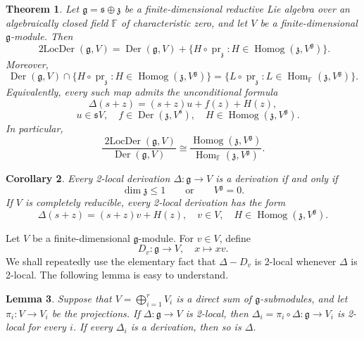 \documentclass[12pt,reqno]{amsart}
\newtheorem{theorem}{Theorem}[section]
\newtheorem{lemma}[theorem]{Lemma}
\newtheorem{corollary}[theorem]{Corollary}
\theoremstyle{definition}
\theoremstyle{remark}
\numberwithin{equation}{section}
\newcommand{\F}{\mathbb{F}}
\newcommand{\g}{\mathfrak{g}}
\newcommand{\s}{\mathfrak{s}}
\newcommand{\z}{\mathfrak{z}}
\newcommand{\Der}{\operatorname{Der}}
\newcommand{\Homog}{\operatorname{Homog}}
\newcommand{\prz}{\operatorname{pr}_{\z}}
\begin{document}
\begin{theorem}\label{thm:reductive}
Let \(\g=\s\oplus\z\) be a finite-dimensional reductive Lie algebra over an
algebraically closed field \(\F\) of characteristic zero, and let \(V\) be a
finite-dimensional \(\g\)-module.  Then
\begin{equation}\label{eq:classification-intro}
 \operatorname{2LocDer}(\g,V)
 =
 \Der(\g,V)
 +
 \{H\circ\prz:H\in\Homog(\z,V^\g)\}.
\end{equation}
Moreover,
\begin{equation}\label{eq:intersection-intro}
 \Der(\g,V)\cap\{H\circ\prz:H\in\Homog(\z,V^\g)\}
=\{L\circ\prz:L\in\operatorname{Hom}_{\F}(\z,V^\g)\}.
\end{equation}
Equivalently, every such map admits the
unconditional formula
\[
 \Delta(s+z)= (s+z)u+f(z)+H(z),
\]
\[
\quad u\in \s V, \quad f\in \Der(\z,V^\s), \quad H\in\Homog(\z,V^\g).
\]
In particular,
\begin{equation}\label{eq:quotient-classification}
 \frac{\operatorname{2LocDer}(\g,V)}{\Der(\g,V)}
 \cong
 \frac{\Homog(\z,V^\g)}
 {\operatorname{Hom}_{\F}(\z,V^\g)}.
\end{equation}
\end{theorem}

\begin{corollary}\label{cor:criterion}
Every 2-local derivation
\(\Delta: \g\to V\) is a derivation if and only if
\[
 \dim\z\leq1
 \qquad\text{or}\qquad
 V^\g=0.
\]
If \(V\) is completely reducible, every 2-local derivation has the form
\begin{equation}\label{eq:cr-form-intro}
 \Delta(s+z)=(s+z)v+H(z),
 \quad
 v\in V,\quad H\in\Homog(\z,V^\g).
\end{equation}
\end{corollary}

Let $V$ be a finite-dimensional $\mathfrak g$-module. For \(v\in V\), define
\[
  D_v\colon\g\longrightarrow V,
  \quad x\longmapsto xv.
\]
We shall repeatedly use the elementary fact that
\(\Delta-D_v\) is 2-local whenever \(\Delta\) is 2-local.
The following lemma is easy to understand.

\begin{lemma}\label{lem:direct-sum-reduction}
Suppose that \(V=\bigoplus_{i=1}^rV_i\) is a direct sum of
\(\g\)-submodules, and let \(\pi_i\colon V\to V_i\) be the projections.  If
\(\Delta\colon\g\to V\) is 2-local, then
\(\Delta_i=\pi_i\circ\Delta\colon\g\to V_i\) is 2-local for every \(i\).  If every
\(\Delta_i\) is a derivation, then so is \(\Delta\).
\end{lemma}
\end{document}
